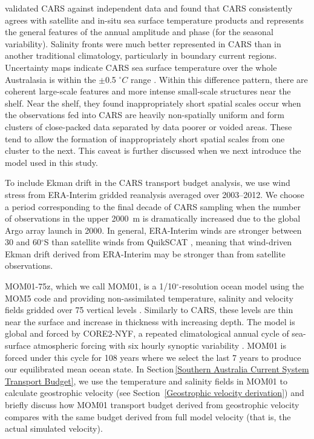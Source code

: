 \documentclass[preprint,3p,review,12pt]{elsarticle}
\newcommand{\dg}{$^{\circ}$}
\begin{document}
\citet{Ridgway2002} validated CARS against independent data and found that CARS consistently agrees with satellite and in-situ sea surface temperature products and represents the general features of the annual amplitude and phase (for the seasonal variability). Salinity fronts were much better represented in CARS than in another traditional climatology, particularly in boundary current regions. Uncertainty maps indicate CARS sea surface temperature over the whole Australasia is within the $\pm$0.5 $^{\circ}C$ range \citep{Ridgway2002}. Within this difference pattern, there are coherent large-scale features and more intense small-scale structures near the shelf. Near the shelf, they found inappropriately short spatial scales occur when the observations fed into CARS are heavily non-spatially uniform and form clusters of close-packed data separated by data poorer or voided areas. These tend to allow the formation of inappropriately short spatial scales from one cluster to the next. This caveat is further discussed when we next introduce the model used in this study.

To include Ekman drift in the CARS transport budget analysis, we use wind stress from ERA-Interim gridded reanalysis \citep{Dee2011} averaged over 2003--2012. We choose a period corresponding to the final decade of CARS sampling when the number of observations in the upper \SI{2000}{m} is dramatically increased due to the global Argo array launch in 2000. In general, ERA-Interim winds are stronger between 30 and 60\dg S than satellite winds from QuikSCAT \citep{Chaudhuri2013}, meaning that wind-driven Ekman drift derived from ERA-Interim may be stronger than from satellite observations.

MOM01-75z, which we call MOM01, is a 1/10\dg-resolution ocean model using the MOM5 code \citep{Griffies2012} and providing non-assimilated temperature, salinity and velocity fields gridded over 75 vertical levels \citep{Stewart2017}. Similarly to CARS, these levels are thin near the surface and increase in thickness with increasing depth.
The model is global and forced by CORE2-NYF, a repeated climatological annual cycle of sea-surface atmospheric forcing with six hourly synoptic variability \citep{Large2009}.
MOM01 is forced under this cycle for 108 years where we select the last 7 years to produce our equilibrated mean ocean state. In Section\,\ref{Southern Australia Current System Transport Budget}, we use the temperature and salinity fields in MOM01 to calculate geostrophic velocity (see Section~\ref{Geostrophic velocity derivation}) and briefly discuss how MOM01 transport budget derived from geostrophic velocity compares with the same budget derived from full model velocity (that is, the actual simulated velocity).
\end{document}
